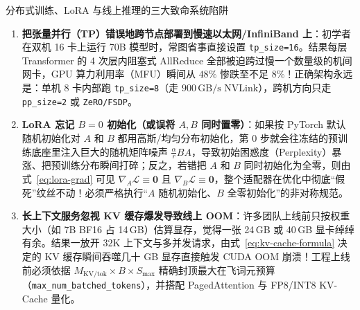 \begin{failBox}{分布式训练、LoRA 与线上推理的三大致命系统陷阱}
\begin{enumerate}
  \item \textbf{把张量并行（TP）错误地跨节点部署到慢速以太网/InfiniBand 上}：初学者在双机 16 卡上运行 70B 模型时，常图省事直接设置 \texttt{tp\_size=16}。结果每层 Transformer 的 4 次层内阻塞式 AllReduce 全部被迫跨过慢一个数量级的机间网卡，GPU 算力利用率（MFU）瞬间从 $48\%$ 惨跌至不足 $8\%$！正确架构永远是：单机 8 卡内部跑 \texttt{tp\_size=8}（走 $900\,\mathrm{GB/s}$ NVLink），跨机方向只走 \texttt{pp\_size=2} 或 \texttt{ZeRO/FSDP}。
  \item \textbf{LoRA 忘记 $B = 0$ 初始化（或误将 $A, B$ 同时置零）}：如果按 PyTorch 默认随机初始化对 $A$ 和 $B$ 都用高斯/均匀分布初始化，第 0 步就会往冻结的预训练底座里注入巨大的随机矩阵噪声 $\frac{\alpha}{r}BA$，导致初始困惑度（Perplexity）暴涨、把预训练分布瞬间打碎；反之，若错把 $A$ 和 $B$ 同时初始化为全零，则由式~\eqref{eq:lora-grad} 可见 $\nabla_A \mathcal{L} \equiv \mathbf{0}$ 且 $\nabla_B \mathcal{L} \equiv \mathbf{0}$，整个适配器在优化中彻底“假死”纹丝不动！必须严格执行“$A$ 随机初始化、$B$ 全零初始化”的非对称规范。
  \item \textbf{长上下文服务忽视 KV 缓存爆发导致线上 OOM}：许多团队上线前只按权重大小（如 7B BF16 占 14\,GB）估算显存，觉得一张 24\,GB 或 40\,GB 显卡绰绰有余。结果一放开 $32\mathrm{K}$ 上下文与多并发请求，由式~\eqref{eq:kv-cache-formula} 决定的 KV 缓存瞬间吞噬几十 GB 显存直接触发 CUDA OOM 崩溃！工程上线前必须依据 $M_{\mathrm{KV/tok}} \times B \times S_{\max}$ 精确封顶最大在飞词元预算（\texttt{max\_num\_batched\_tokens}），并搭配 PagedAttention 与 FP8/INT8 KV-Cache 量化。
\end{enumerate}
\end{failBox}

